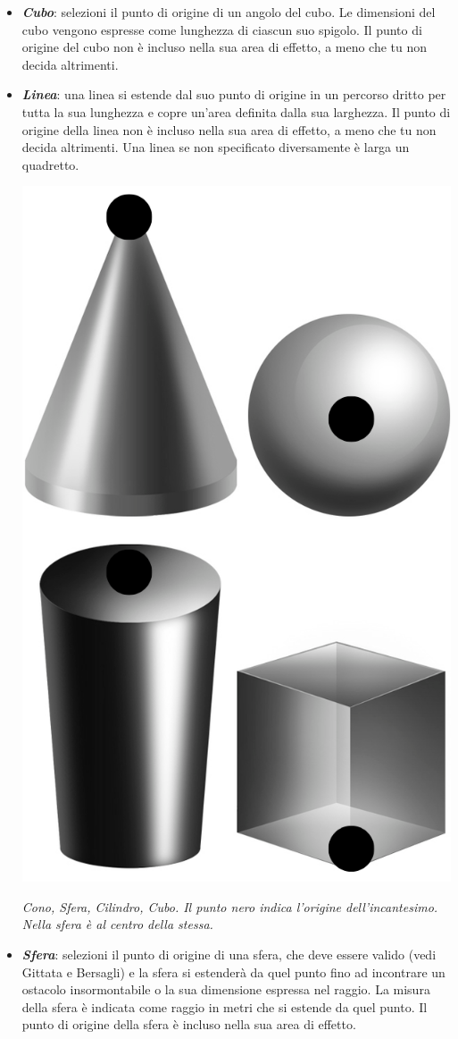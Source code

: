\begin{multicols}{2}
\begin{itemize}[leftmargin=*]
\item \emph{\textbf{Cubo}}: selezioni il punto di origine di un angolo del cubo. Le dimensioni del cubo vengono espresse come lunghezza di ciascun suo spigolo. Il punto di origine del cubo non è incluso nella sua area di effetto, a meno che tu non decida altrimenti.

\item \emph{\textbf{Linea}}: una linea si estende dal suo punto di origine in un percorso dritto per tutta la sua lunghezza e copre un'area definita dalla sua larghezza. Il punto di origine della linea non è incluso nella sua area di effetto, a meno che tu non decida altrimenti. Una linea se non specificato diversamente è larga un quadretto.


\begin{center}
	\includegraphics[width=0.6\linewidth]{immagini/3dformev2.png}

	\emph{Cono, Sfera, Cilindro, Cubo. Il punto nero indica l'origine dell'incantesimo. Nella sfera è al centro della stessa.}
\end{center}

\item \emph{\textbf{Sfera}}: selezioni il punto di origine di una sfera, che deve essere valido (vedi Gittata e Bersagli) e la sfera si estenderà da quel punto fino ad incontrare un ostacolo insormontabile o la sua dimensione espressa nel raggio. La misura della sfera è indicata come raggio in metri che si estende da quel punto. Il punto di origine della sfera è incluso nella sua area di effetto.


\end{itemize}
\end{multicols}
